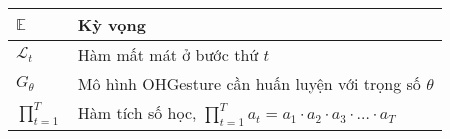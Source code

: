 \begin{center}
\begin{tabular}{|p{3cm}|p{11cm}|}
$\mathbb{E}$ & Kỳ vọng \\
\hline
$\mathcal{L}_t$ & Hàm mất mát ở bước thứ $t$ \\
\hline
$G_\theta$ & Mô hình OHGesture cần huấn luyện với trọng số $\theta$ \\
\hline
$\prod^T_{t=1}$ & Hàm tích số học, $\prod_{t=1}^T a_t = a_1 \cdot a_2 \cdot a_3 \cdot \ldots \cdot a_T$  \\
\hline


\end{tabular}
\end{center}


\pagebreak
